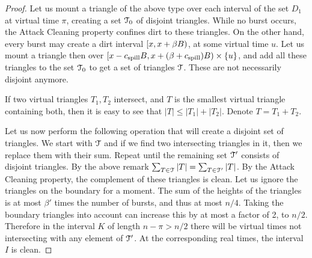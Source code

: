 \documentclass[12pt]{memoir}
\renewcommand{\le}{\leq}
\def\B{B}
\newcommand{\cns}[1]{c_{\textrm{\upshape #1}}}
\newcommand{\CSpill}{\cns{spill}}
\begin{document}
\begin{proof}
\begin{sloppypar}
Let us mount a triangle of the above type over each interval of the set \( D_{1} \)
at virtual time \( \pi \), creating a set \( \mathcal{T}_{0} \) of disjoint triangles.
While no burst occurs, the Attack Cleaning property confines dirt to these triangles.
On the other hand, every burst may create a dirt interval 
\( \lint{x}{x+\beta\B} \), at some virtual time \( u \).
Let us mount a triangle then over \( \lint{x-\CSpill B}{x+(\beta+\CSpill)\B}\times\{u\} \),
and add all these triangles to the set \( \mathcal{T}_{0} \) to get a set of triangles \( \mathcal{T} \).
These are not necessarily disjoint anymore.
  \end{sloppypar}

If two virtual triangles \( T_{1},T_{2} \) intersect,
and \( T \) is the smallest virtual triangle containing both,
then it is easy to see that \( |T|\le|T_{1}|+|T_{2}| \).
Denote \( T=T_{1}+T_{2} \).

Let us now perform the following operation that will create a disjoint set
of triangles.
We start with \( \mathcal{T} \) and if we find two intersecting triangles 
in it, then we replace them with their sum.
Repeat until the remaining set \( \mathcal{T}' \) consists of disjoint triangles.
By the above remark \( \sum_{T\in \mathcal{T}}|T| = \sum_{T\in \mathcal{T}'}|T| \).
By the Attack Cleaning property, the complement of these triangles
is clean.
Let us ignore the triangles on the boundary for a moment.
The sum of the heights of the triangles is at most \( \beta' \) times the number of bursts,
and thus at most \( n/4 \).
Taking the boundary triangles into account can increase this by at most a factor of 2, to \( n/2 \).
Therefore in the interval \( K \) of length \( n-\pi>n/2 \) there will be virtual
times not intersecting with any element of \( \mathcal{T}' \).
At the corresponding real times, the interval \( I \) is clean.
\end{proof}
\end{document}
